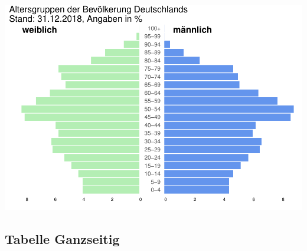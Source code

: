 \documentclass[
  a4paper,
  twoside]{article}
\begin{document}
\vspace{5mm}

\includegraphics[width=1\linewidth]{2021-03-02_Beispiel_files/figure-latex/plot Pyramide 1 spaltig-1}

\newpage

\hypertarget{tabelle-ganzseitig}{%
\subsection{Tabelle Ganzseitig}\label{tabelle-ganzseitig}}
\end{document}
